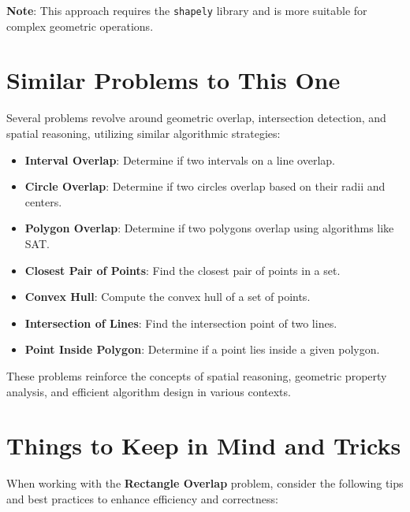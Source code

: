 \textbf{Note}: This approach requires the \texttt{shapely} library and is more suitable for complex geometric operations.

\section*{Similar Problems to This One}

Several problems revolve around geometric overlap, intersection detection, and spatial reasoning, utilizing similar algorithmic strategies:

\begin{itemize}
    \item \textbf{Interval Overlap}: Determine if two intervals on a line overlap.
    \item \textbf{Circle Overlap}: Determine if two circles overlap based on their radii and centers.
    \item \textbf{Polygon Overlap}: Determine if two polygons overlap using algorithms like SAT.
    \item \textbf{Closest Pair of Points}: Find the closest pair of points in a set.
    \item \textbf{Convex Hull}: Compute the convex hull of a set of points.
    \item \textbf{Intersection of Lines}: Find the intersection point of two lines.
    \item \textbf{Point Inside Polygon}: Determine if a point lies inside a given polygon.
\end{itemize}

These problems reinforce the concepts of spatial reasoning, geometric property analysis, and efficient algorithm design in various contexts.

\section*{Things to Keep in Mind and Tricks}

When working with the \textbf{Rectangle Overlap} problem, consider the following tips and best practices to enhance efficiency and correctness:

